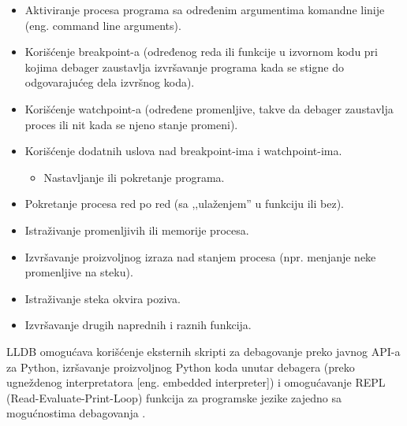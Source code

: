 \documentclass[a4paper]{article}
\begin{document}
\begin{itemize}
	\item{Aktiviranje procesa programa sa određenim argumentima komandne linije
		(eng. command line arguments).}
	
	\item{Korišćenje breakpoint-a (određenog reda ili funkcije u izvornom kodu pri
		kojima debager zaustavlja izvršavanje programa kada se stigne do odgovarajućeg
		dela izvršnog koda).}
	
	\item{Korišćenje watchpoint-a (određene promenljive, takve da debager zaustavlja
		proces ili nit kada se njeno stanje promeni).}
	
	\item{Korišćenje dodatnih uslova nad breakpoint-ima i watchpoint-ima.}
	\begin{itemize}
		\item{Nastavljanje ili pokretanje programa.}
	\end{itemize}
	
	\item{Pokretanje procesa red po red (sa ,,ulaženjem'' u funkciju ili bez).}
	
	\item{Istraživanje promenljivih ili memorije procesa.}
	
	\item{Izvršavanje proizvoljnog izraza nad stanjem procesa (npr. menjanje neke
		promenljive na steku).}
	
	\item{Istraživanje steka okvira poziva.}
	
	\item{Izvršavanje drugih naprednih i raznih funkcija.}
\end{itemize}

LLDB omogućava korišćenje eksternih skripti za debagovanje preko javnog API-a za Python, izršavanje proizvoljnog Python koda unutar debagera \cite{lldb_python} (preko ugneždenog interpretatora [eng. embedded interpreter]) i omogućavanje REPL (Read-Evaluate-Print-Loop) funkcija za programske jezike zajedno sa mogućnostima debagovanja \cite{swift_lldb_repl}.
\end{document}
